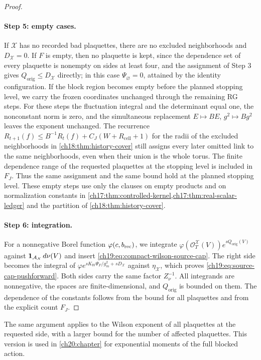 \begin{proof}
\paragraph{Step 5: empty cases.}
If $\mathcal X$ has no recorded bad plaquettes, there are no excluded neighborhoods and $D_{\mathcal X}=0$. If $F$ is empty, then no plaquette is kept, since the dependence set of every plaquette is nonempty on sides at least four, and the assignment of Step 3 gives $Q_{\mathrm{orig}}\le D_{\mathcal X}$ directly; in this case $\Psi_\varnothing=0$, attained by the identity configuration. If the block region becomes empty before the planned stopping level, we carry the frozen coordinates unchanged through the remaining RG steps. For these steps the fluctuation integral and the determinant equal one, the nonconstant norm is zero, and the simultaneous replacement $E\mapsto BE$, $g^2\mapsto Bg^2$ leaves the exponent unchanged. The recurrence $R_{t+1}(f)\le B^{-1}R_t(f)+C_J(W+R_{\mathrm{cell}}+1)$ for the radii of the excluded neighborhoods in \cref{ch18:thm:history-cover} still assigns every later omitted link to the same neighborhoods, even when their union is the whole torus. The finite dependence range of the requested plaquettes at the stopping level is included in $F_J$. Thus the same assignment and the same bound hold at the planned stopping level. These empty steps use only the clauses on empty products and on normalization constants in \cref{ch17:thm:controlled-kernel,ch17:thm:real-scalar-ledger} and the partition of \cref{ch18:thm:history-cover}.

\paragraph{Step 6: integration.}
For a nonnegative Borel function $\varphi(c,b_{\mathrm{rec}})$, we integrate $\varphi(\mathscr O_T^{\mathcal X}(V))e^{sQ_{\mathrm{orig}}(V)}$ against $\mathbf 1_{\mathcal A_{\mathcal X}}\,d\nu(V)$ and insert \eqref{ch19:eq:compact-wilson-source-cap}. The right side becomes the integral of $\varphi e^{sK_W\Psi_F/g_m^2+sD_{\mathcal X}}$ against $\eta_{\mathcal X}$, which proves \eqref{ch19:eq:source-cap-pushforward}. Both sides carry the same factor $Z_\nu^{-1}$. All integrands are nonnegative, the spaces are finite-dimensional, and $Q_{\mathrm{orig}}$ is bounded on them. The dependence of the constants follows from the bound for all plaquettes and from the explicit count $F_J$.
\end{proof}

The same argument applies to the Wilson exponent of all plaquettes at the requested side, with a larger bound for the number of affected plaquettes. This version is used in \cref{ch20:chapter} for exponential moments of the full blocked action.

